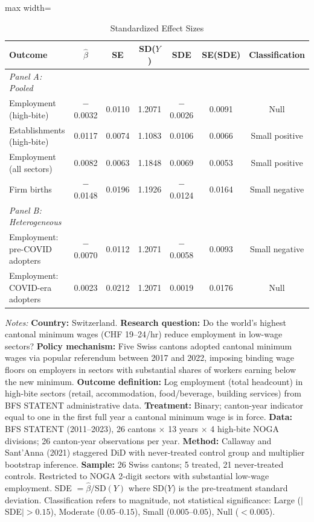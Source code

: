 \begin{table}[htbp]
\centering
\caption{Standardized Effect Sizes}
\label{tab:sde}
\begin{adjustbox}{max width=\textwidth}
\begin{tabular}{lcccccc}
\hline\hline
Outcome & $\hat{\beta}$ & SE & SD($Y$) & SDE & SE(SDE) & Classification \\
\hline
\textit{Panel A: Pooled} & & & & & & \\
Employment (high-bite) & $-$0.0032 & 0.0110 & 1.2071 & $-$0.0026 & 0.0091 & Null \\
Establishments (high-bite) & 0.0117 & 0.0074 & 1.1083 & 0.0106 & 0.0066 & Small positive \\
Employment (all sectors) & 0.0082 & 0.0063 & 1.1848 & 0.0069 & 0.0053 & Small positive \\
Firm births & $-$0.0148 & 0.0196 & 1.1926 & $-$0.0124 & 0.0164 & Small negative \\[6pt]
\textit{Panel B: Heterogeneous} & & & & & & \\
Employment: pre-COVID adopters & $-$0.0070 & 0.0112 & 1.2071 & $-$0.0058 & 0.0093 & Small negative \\
Employment: COVID-era adopters & 0.0023 & 0.0212 & 1.2071 & 0.0019 & 0.0176 & Null \\
\hline\hline
\end{tabular}
\end{adjustbox}

\vspace{0.5em}
\begin{minipage}{\textwidth}
\scriptsize
\textit{Notes:} \textbf{Country:} Switzerland. \textbf{Research question:} Do the world's highest cantonal minimum wages (CHF 19--24/hr) reduce employment in low-wage sectors? \textbf{Policy mechanism:} Five Swiss cantons adopted cantonal minimum wages via popular referendum between 2017 and 2022, imposing binding wage floors on employers in sectors with substantial shares of workers earning below the new minimum. \textbf{Outcome definition:} Log employment (total headcount) in high-bite sectors (retail, accommodation, food/beverage, building services) from BFS STATENT administrative data. \textbf{Treatment:} Binary; canton-year indicator equal to one in the first full year a cantonal minimum wage is in force. \textbf{Data:} BFS STATENT (2011--2023), 26 cantons $\times$ 13 years $\times$ 4 high-bite NOGA divisions; 26 canton-year observations per year. \textbf{Method:} Callaway and Sant'Anna (2021) staggered DiD with never-treated control group and multiplier bootstrap inference. \textbf{Sample:} 26 Swiss cantons; 5 treated, 21 never-treated controls. Restricted to NOGA 2-digit sectors with substantial low-wage employment. SDE $= \hat{\beta} / \text{SD}(Y)$ where SD($Y$) is the pre-treatment standard deviation. Classification refers to magnitude, not statistical significance: Large ($|$SDE$| > 0.15$), Moderate ($0.05$--$0.15$), Small ($0.005$--$0.05$), Null ($< 0.005$).
\end{minipage}
\end{table}

